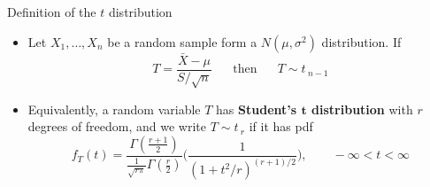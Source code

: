 \documentclass{article}
\newcommand{\vecn}[2]{#1_1, \ldots, #1_{#2}}	%
\newcommand{\follow}[1]{\sim \text{#1}\,}		%
\newcommand{\gam}[1]{\Gamma(#1)}		%
\begin{document}
Definition of the $t$ distribution\bigskip
\begin{itemize}
    \item Let $\vecn{X}{n}$ be a random sample form a $N(\mu, \sigma^2)$ distribution. If
    \[T = \frac{\bar{X} - \mu}{S / \sqrt{n}} \hspace{20pt} \text{then} \hspace{20pt} T \follow{$t$}_{n-1}\]
    \item[] Equivalently, a random variable $T$ has \textbf{Student's $\boldsymbol{t}$ distribution} with $r$ degrees of freedom, and we write $T \follow{$t$}_r$ if it has pdf
\[f_T(t) = \frac{\gam{\frac{r + 1}{2}}}{\frac{1}{\sqrt{r \pi}} \gam{\frac{r}{2}}} \bigg(\frac{1}{(1 + t^2 / r)^{(r + 1) / 2}}\bigg), \quad\quad -\infty < t < \infty\]
\end{itemize}
\end{document}
